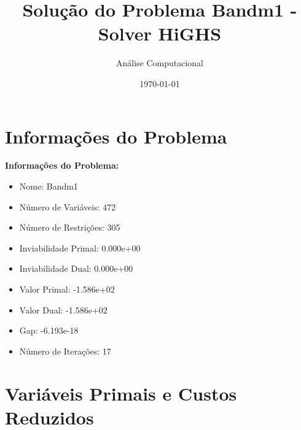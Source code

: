 \documentclass[12pt]{article}
\title{Solução do Problema Bandm1 - Solver HiGHS}
\author{Análise Computacional}
\date{\today}
\begin{document}
\maketitle

\section{Informações do Problema}

\textbf{Informações do Problema:}
\begin{itemize}
\item Nome: Bandm1
\item Número de Variáveis: 472
\item Número de Restrições: 305
\item Inviabilidade Primal: 0.000e+00
\item Inviabilidade Dual: 0.000e+00
\item Valor Primal: -1.586e+02
\item Valor Dual: -1.586e+02
\item Gap: -6.193e-18
\item Número de Iterações: 17
\end{itemize}


\section{Variáveis Primais e Custos Reduzidos}
\end{document}
